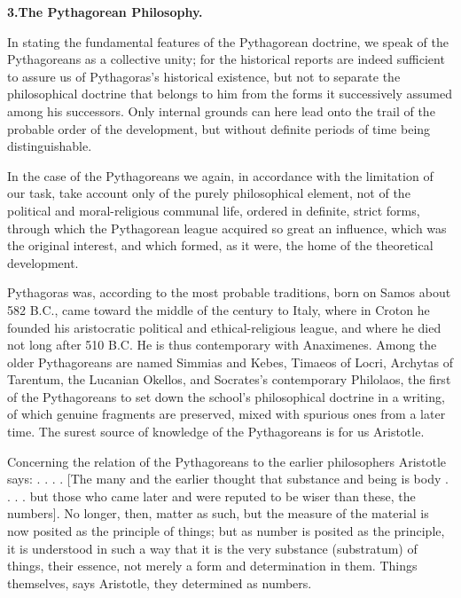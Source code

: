 \divrule

\begin{center}
\textbf{3.\enspace The Pythagorean Philosophy.}
\end{center}

In stating the fundamental features of the Pythagorean doctrine, we
speak of the Pythagoreans as a collective unity; for the historical
reports are indeed sufficient to assure us of Pythagoras's historical
existence, but not to separate the philosophical doctrine that belongs
to him from the forms it successively assumed among his
successors. Only internal grounds can here lead onto the trail of the
probable order of the development, but without definite periods of time
being distinguishable.

In the case of the Pythagoreans we again, in accordance with the
limitation of our task, take account only of the purely philosophical
element, not of the political and moral-religious communal life,
ordered in definite, strict forms, through which the Pythagorean league
acquired so great an influence, which was the original interest, and
which formed, as it were, the home of the theoretical development.

Pythagoras was, according to the most probable traditions, born on
Samos about 582 B.C., came toward the middle of the century to Italy,
where in Croton he founded his aristocratic political and
ethical-religious league, and where he died not long after 510 B.C. He
is thus contemporary with Anaximenes. Among the older Pythagoreans are
named Simmias and Kebes, Timaeos of Locri, Archytas of Tarentum, the
Lucanian Okellos, and Socrates's contemporary Philolaos, the first of
the Pythagoreans to set down the school's philosophical doctrine in a
writing, of which genuine fragments are preserved, mixed with spurious
ones from a later time. The surest source of knowledge of the
Pythagoreans is for us Aristotle.

Concerning the relation of the Pythagoreans to the earlier philosophers
Aristotle says: 
. . . . 
\emph{} [The many and the earlier thought that
substance and being is body . . . . but those who came later and were
reputed to be wiser than these, the numbers]. No longer, then, matter
as such, but the measure of the material is now posited as the
principle of things; but as number is posited as the principle, it is
understood in such a way that it is the very substance (substratum) of
things, their essence, not merely a form and determination in them.
Things themselves, says Aristotle, they determined as numbers.

